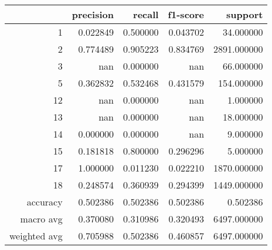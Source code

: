 \begin{tabular}{rrrrr}
\toprule
 & precision & recall & f1-score & support \\
\midrule
1 & 0.022849 & 0.500000 & 0.043702 & 34.000000 \\
2 & 0.774489 & 0.905223 & 0.834769 & 2891.000000 \\
3 & nan & 0.000000 & nan & 66.000000 \\
5 & 0.362832 & 0.532468 & 0.431579 & 154.000000 \\
12 & nan & 0.000000 & nan & 1.000000 \\
13 & nan & 0.000000 & nan & 18.000000 \\
14 & 0.000000 & 0.000000 & nan & 9.000000 \\
15 & 0.181818 & 0.800000 & 0.296296 & 5.000000 \\
17 & 1.000000 & 0.011230 & 0.022210 & 1870.000000 \\
18 & 0.248574 & 0.360939 & 0.294399 & 1449.000000 \\
accuracy & 0.502386 & 0.502386 & 0.502386 & 0.502386 \\
macro avg & 0.370080 & 0.310986 & 0.320493 & 6497.000000 \\
weighted avg & 0.705988 & 0.502386 & 0.460857 & 6497.000000 \\
\bottomrule
\end{tabular}
